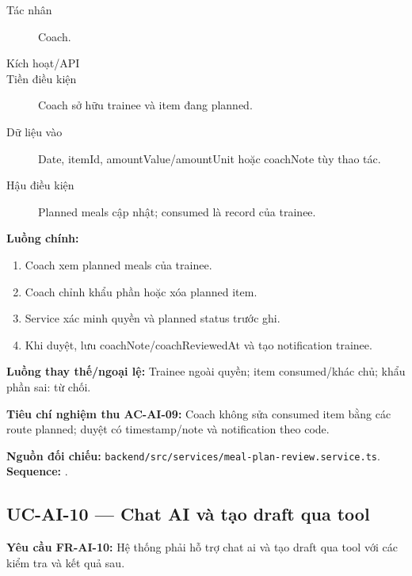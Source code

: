 \documentclass[12pt,a4paper]{article}
\newcommand{\evidence}[1]{{\small\nolinkurl{#1}}}
\begin{document}
\begin{description}
\item[Tác nhân] Coach.
\item[Kích hoạt/API] 
\item[Tiền điều kiện] Coach sở hữu trainee và item đang planned.
\item[Dữ liệu vào] Date, itemId, amountValue/amountUnit hoặc coachNote tùy thao tác.
\item[Hậu điều kiện] Planned meals cập nhật; consumed là record của trainee.
\end{description}
\textbf{Luồng chính:}
\begin{enumerate}
  \item Coach xem planned meals của trainee.
  \item Coach chỉnh khẩu phần hoặc xóa planned item.
  \item Service xác minh quyền và planned status trước ghi.
  \item Khi duyệt, lưu coachNote/coachReviewedAt và tạo notification trainee.
\end{enumerate}
\textbf{Luồng thay thế/ngoại lệ:} Trainee ngoài quyền; item consumed/khác chủ; khẩu phần sai: từ chối.

\textbf{Tiêu chí nghiệm thu AC-AI-09:} Coach không sửa consumed item bằng các route planned; duyệt có timestamp/note và notification theo code.

\textbf{Nguồn đối chiếu:} \evidence{backend/src/services/meal-plan-review.service.ts}. \textbf{Sequence:} .

\subsection{UC-AI-10 --- Chat AI và tạo draft qua tool}
\label{uc-ai-10}
\textbf{Yêu cầu FR-AI-10:} Hệ thống phải hỗ trợ chat ai và tạo draft qua tool với các kiểm tra và kết quả sau.
\end{document}

